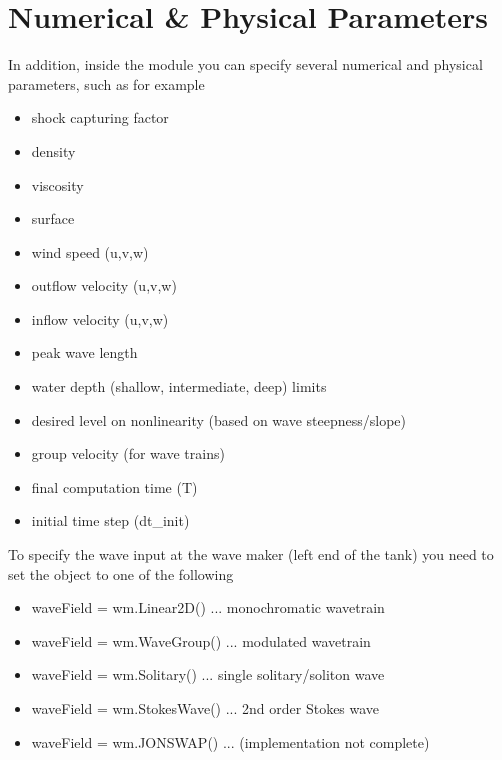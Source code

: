 \documentclass[letterpaper,12pt,english]{sphinxmanual}
\begin{document}
\section{Numerical \& Physical Parameters}
\label{index:numerical-physical-parameters}
In addition, inside the  module you can specify several numerical and physical parameters, such as for example
\begin{itemize}
\item {} 
shock capturing factor

\item {} 
density

\item {} 
viscosity

\item {} 
surface

\item {} 
wind speed (u,v,w)

\item {} 
outflow velocity (u,v,w)

\item {} 
inflow velocity (u,v,w)

\item {} 
peak wave length

\item {} 
water depth (shallow, intermediate, deep) limits

\item {} 
desired level on nonlinearity (based on wave steepness/slope)

\item {} 
group velocity (for wave trains)

\item {} 
final computation time (T)

\item {} 
initial time step (dt\_init)

\end{itemize}

To specify the wave input at the wave maker (left end of the tank) you need to set the  object to one of the following
\begin{itemize}
\item {} 
waveField = wm.Linear2D()    ... monochromatic wavetrain

\item {} 
waveField = wm.WaveGroup()   ... modulated wavetrain

\item {} 
waveField = wm.Solitary()    ... single solitary/soliton wave

\item {} 
waveField = wm.StokesWave()  ... 2nd order Stokes wave

\item {} 
waveField = wm.JONSWAP()     ... (implementation not complete)

\end{itemize}
\end{document}
